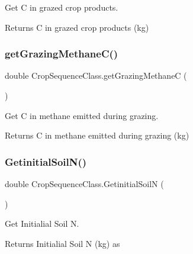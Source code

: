 Get C in grazed crop products. 

\begin{DoxyReturn}{Returns}
C in grazed crop products (kg) 
\end{DoxyReturn}
\mbox{\label{class_crop_sequence_class_ab4dd8d2bb35bc75f0f7e3d916251553f}} 
\subsubsection{\texorpdfstring{getGrazingMethaneC()}{getGrazingMethaneC()}}
{\footnotesize\ttfamily double Crop\+Sequence\+Class.\+get\+Grazing\+MethaneC (\begin{DoxyParamCaption}{ }\end{DoxyParamCaption})\hspace{0.3cm}{\ttfamily [inline]}}



Get C in methane emitted during grazing. 

\begin{DoxyReturn}{Returns}
C in methane emitted during grazing (kg) 
\end{DoxyReturn}
\mbox{\label{class_crop_sequence_class_a2855cea389afe7a231c99e8dda48bcbe}} 
\subsubsection{\texorpdfstring{GetinitialSoilN()}{GetinitialSoilN()}}
{\footnotesize\ttfamily double Crop\+Sequence\+Class.\+Getinitial\+SoilN (\begin{DoxyParamCaption}{ }\end{DoxyParamCaption})\hspace{0.3cm}{\ttfamily [inline]}}



Get Initialial Soil N. 

\begin{DoxyReturn}{Returns}
Initialial Soil N (kg) as 
\end{DoxyReturn}
\mbox{\label{class_crop_sequence_class_a53a1fba19a3f7194449b74c643927437}} 
